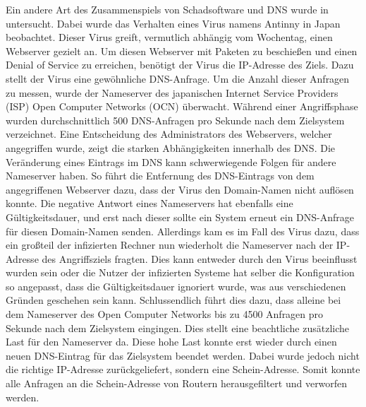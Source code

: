 \documentclass[a4paper, 12pt, BCOR10mm, DIV12, toc=bibliography, toc=listof, german]{scrbook}
\begin{document}
	Ein andere Art des Zusammenspiels von Schadsoftware und DNS wurde in \cite{isetal2005} untersucht.
	Dabei wurde das Verhalten eines Virus namens \glqq{}Antinny\grqq{} in Japan beobachtet. Dieser Virus
	greift, vermutlich abhängig vom Wochentag, einen Webserver gezielt an. Um diesen Webserver mit
	Paketen zu beschießen und einen Denial of Service zu erreichen, benötigt der Virus die IP-Adresse
	des Ziels. Dazu stellt der Virus eine gewöhnliche DNS-Anfrage. Um die Anzahl dieser Anfragen zu
	messen, wurde der Nameserver des japanischen Internet Service Providers (ISP) Open Computer
	Networks (OCN) überwacht. Während einer Angriffsphase wurden durchschnittlich 500 DNS-Anfragen pro
	Sekunde nach dem Zielsystem verzeichnet. Eine Entscheidung des Administrators des Webservers,
	welcher angegriffen wurde, zeigt die starken Abhängigkeiten innerhalb des DNS. Die Veränderung
	eines Eintrags im DNS kann schwerwiegende Folgen für andere Nameserver haben. So führt die
	Entfernung des DNS-Eintrags von dem angegriffenen Webserver dazu, dass der Virus den Domain-Namen
	nicht auflösen konnte. Die negative Antwort eines Nameservers hat ebenfalls eine Gültigkeitsdauer,
	und erst nach dieser sollte ein System erneut ein DNS-Anfrage für diesen Domain-Namen senden.
	Allerdings kam es im Fall des Virus dazu, dass ein großteil der infizierten Rechner nun wiederholt
	die Nameserver nach der IP-Adresse des Angriffsziels fragten. Dies kann entweder durch den Virus
	beeinflusst wurden sein oder die Nutzer der infizierten Systeme hat selber die Konfiguration so
	angepasst, dass die Gültigkeitsdauer ignoriert wurde, was aus verschiedenen Gründen
	geschehen sein kann. Schlussendlich führt dies dazu, dass alleine bei dem Nameserver des Open Computer
	Networks bis zu 4500 Anfragen pro Sekunde nach dem Zielsystem eingingen. Dies stellt eine
	beachtliche zusätzliche Last für den Nameserver da. Diese hohe Last konnte erst wieder durch einen
	neuen DNS-Eintrag für das Zielsystem beendet werden. Dabei wurde jedoch nicht die richtige
	IP-Adresse zurückgeliefert, sondern eine Schein-Adresse. Somit konnte alle Anfragen an die
	Schein-Adresse von Routern herausgefiltert und verworfen werden.
\end{document}
